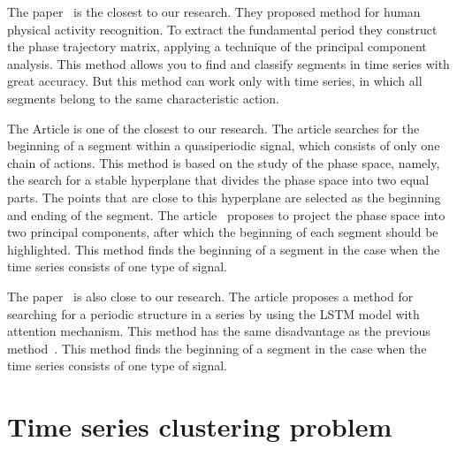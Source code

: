 \documentclass[12pt, twoside]{article}
\numberwithin{equation}{section}
\begin{document}
The paper~\cite{Ignatov2015} is the closest to our research.
They proposed method for human physical activity recognition.
To extract the fundamental period they construct the phase trajectory matrix, applying a technique of the principal component analysis. 
This method allows you to find and classify segments in time series with great accuracy. But this method can work only with time series, in which all segments belong to the same characteristic action.

The Article\cite{motrenko2015} is one of the closest to our research.
The article searches for the beginning of a segment within a quasiperiodic signal, which consists of only one chain of actions.
This method is based on the study of the phase space, namely, the search for a stable hyperplane that divides the phase space into two equal parts.
The points that are close to this hyperplane are selected as the beginning and ending of the segment.
The article~\cite{motrenko2015} proposes to project the phase space into two principal components, after which the beginning of each segment should be highlighted.
This method finds the beginning of a segment in the case when the time series consists of one type of signal.

The paper~\cite{cinar2018} is also close to our research. 
The article proposes a method for searching for a periodic structure in a series by using the LSTM model with attention mechanism.
This method has the same disadvantage as the previous method~\cite{motrenko2015}. This method finds the beginning of a segment in the case when the time series consists of one type of signal.


\section{Time series clustering problem}
\end{document}
